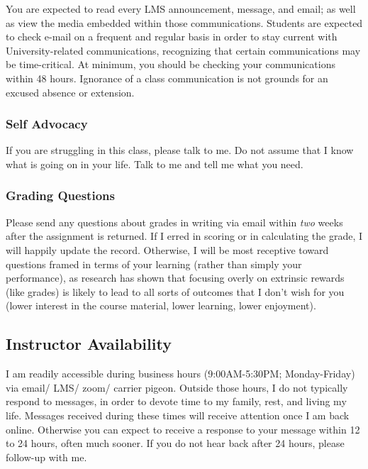 \documentclass[11pt,]{article}
\begin{document}
You are expected to read every LMS announcement, message, and email; as
well as view the media embedded within those communications. Students
are expected to check e-mail on a frequent and regular basis in order to
stay current with University-related communications, recognizing that
certain communications may be time-critical. At minimum, you should be
checking your communications within 48 hours. Ignorance of a class
communication is not grounds for an excused absence or extension.

\hypertarget{self-advocacy}{%
\subsubsection{Self Advocacy}\label{self-advocacy}}

If you are struggling in this class, please talk to me. Do not assume
that I know what is going on in your life. Talk to me and tell me what
you need.

\hypertarget{grading-questions}{%
\subsubsection{Grading Questions}\label{grading-questions}}

Please send any questions about grades in writing via email within
\emph{two} weeks after the assignment is returned. If I erred in scoring
or in calculating the grade, I will happily update the record.
Otherwise, I will be most receptive toward questions framed in terms of
your learning (rather than simply your performance), as research has
shown that focusing overly on extrinsic rewards (like grades) is likely
to lead to all sorts of outcomes that I don't wish for you (lower
interest in the course material, lower learning, lower enjoyment).

\hypertarget{instructor-availability}{%
\subsection{Instructor Availability}\label{instructor-availability}}

I am readily accessible during business hours (9:00AM-5:30PM;
Monday-Friday) via email/ LMS/ zoom/ carrier pigeon. Outside those
hours, I do not typically respond to messages, in order to devote time
to my family, rest, and living my life. Messages received during these
times will receive attention once I am back online. Otherwise you can
expect to receive a response to your message within 12 to 24 hours,
often much sooner. If you do not hear back after 24 hours, please
follow-up with me.
\end{document}
